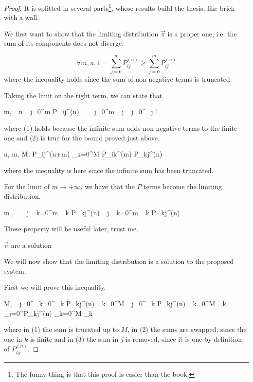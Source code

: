 	\begin{proof}
		It is splitted in several parts\footnote{The funny thing is that this proof is easier than the book.}, whose results build the thesis, like brick with a wall.

		\proofpart

			We first want to show that the limiting distribution $\vec{\pi}$ is a proper one, i.e. the sum of its components does not diverge.

			\begin{equation*}
				\forall m,n,
					1 = \sum_{j=0}^\infty P_{ij}^{(n)}
					\ge \sum_{j=0}^m P_{ij}^{(n)}
			\end{equation*}
			where the inequality holds since the sum of non-negative terms is truncated.

			Taking the limit on the right term, we can state that
			\begin{esp*}
				\forall m, \lim_{n \to \infty} \sum_{j=0}^m P_{ij}^{(n)}
					= \sum_{j=0}^m \pi_j
					 \sum_{j=0}^\infty \pi_j
					 1
			\end{esp*}
			where (1) holds because the infinite sum adds non-negative terms to the finite one and (2) is true for the bound proved just above.

		\proofpart
			\begin{esp*}
				\forall n, m, M,
					P_{ij}^{(n+m)} \geq \sum_{k=0}^M P_{ik}^{(m)} P_{kj}^{(n)}
			\end{esp*}
			where the inequality is here since the infinite sum has been truncated.

			For the limit of $m \to +\infty$, we have that the $P$ terms become the limiting distribution.
			\begin{esp} \label{eq:pi_inequality}
				 m \to \infty, ~
					\pi_j \geq \sum_{k=0}^m \pi_k P_{kj}^{(n)}
					\implies  \pi_j \geq \sum_{k=0}^m \pi_k P_{kj}^{(n)}
			\end{esp}
			These property will be useful later, trust me.

		\proofpart $\vec{\pi}$ are a solution \label{part:pi_are_solution}

			We will now show that the limiting distribution is a solution to the proposed system.

			First we will prove this inequality.
			\begin{esp} \label{eq:pis_inequality}
				\forall M,
				\sum_{j=0}^\infty \sum_{k=0}^\infty \pi_k P_{kj}^{(n)}
					 \sum_{k=0}^M \sum_{j=0}^\infty \pi_k P_{kj}^{(n)}
					 \sum_{k=0}^M \pi_k \sum_{j=0}^\infty P_{kj}^{(n)}
					  \sum_{k=0}^M \pi_k
			\end{esp}
			where in (1) the sum is trucated up to $M$, in (2) the sums are swapped, since the one in $k$ is finite and in (3) the sum in $j$ is removed, since it is one by definition of $P_{kj}^{(n)}$.


\end{proof}
